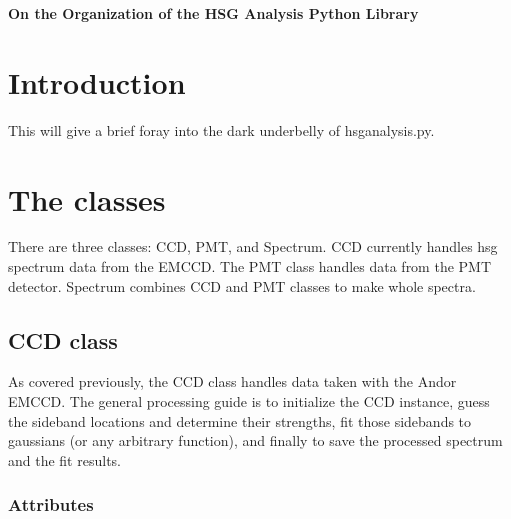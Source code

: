 \documentclass{article}
\begin{document}
	\begin{center}
		\begin{Large}
			\textbf{On the Organization of the HSG Analysis Python Library}\vspace{5pt}\\
		\end{Large}
	\end{center}

\section{Introduction}
\indent \indent This will give a brief foray into the dark underbelly of hsganalysis.py.
\section{The classes}
\indent \indent There are three classes: CCD, PMT, and Spectrum.  CCD currently handles hsg spectrum data from the EMCCD.  The PMT class handles data from the PMT detector.  Spectrum combines CCD and PMT classes to make whole spectra.
\subsection{CCD class}
\indent \indent As covered previously, the CCD class handles data taken with the Andor EMCCD.  The general processing guide is to initialize the CCD instance, guess the sideband locations and determine their strengths, fit those sidebands to gaussians (or any arbitrary function), and finally to save the processed spectrum and the fit results.
\subsubsection{Attributes}
\end{document}
